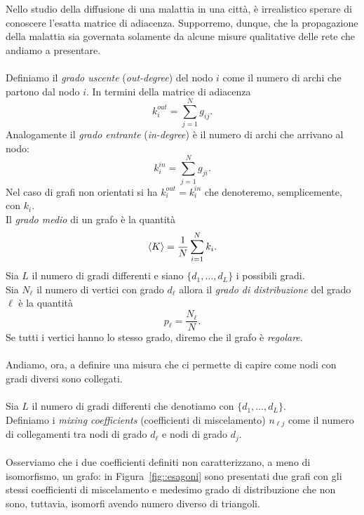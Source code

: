Nello studio della diffusione di una malattia in una citt\`a, \`e irrealistico sperare di conoscere l'esatta matrice di adiacenza. Supporremo, dunque, che la propagazione della malattia sia governata solamente da alcune misure qualitative delle rete che andiamo a presentare.\\ \\
Definiamo il \textit{grado uscente} (\textit{out-degree})  del nodo $i$  come il numero di archi che partono dal nodo $i$. In termini della matrice di adiacenza
$$ k_i^{out} =\sum_{j=1}^N g_{ij}.$$
Analogamente il \textit{grado entrante} (\textit{in-degree}) \`e il numero di archi che arrivano al nodo:
$$ k_i^{in} = \sum_{j=1}^N g_{ji}.$$
Nel caso di grafi non orientati si ha $k_i^{out} = k_i^{in}$ che denoteremo, semplicemente, con $k_i$.\\
Il \textit{grado medio} di un grafo \`e la quantit\`a 
$$ \langle K \rangle = \frac{1}{N}\sum_{i=1}^N k_i.$$
Sia $L$ il numero di gradi differenti e siano $\{ d_1, \dots, d_L\}$ i possibili gradi.\\
Sia $N_\ell$ il numero di vertici con grado $d_\ell$ allora il \textit{grado di distribuzione} del grado $\ell$ \`e la quantit\`a
$$ p_\ell = \frac{N_\ell}{N}.$$
Se tutti i vertici hanno lo stesso grado, diremo che il grafo \`e \textit{regolare}.\\  \\
Andiamo, ora, a definire una misura che ci permette di capire  come nodi con gradi diversi sono collegati.\\ \\ 
Sia $L$ il numero di gradi differenti che denotiamo con $\{ d_1, \dots, d_L\}$.\\
Definiamo i \textit{mixing coefficients} (coefficienti di miscelamento) $n_{\ell j}$ come il numero di collegamenti tra nodi di grado $d_\ell$ e nodi di grado $d_j$.\\ \\ 
Osserviamo che i due coefficienti definiti non caratterizzano, a meno di isomorfismo, un grafo: in  Figura~\ref{fig::esagoni}  sono presentati due grafi con gli stessi coefficienti di miscelamento e medesimo  grado di distribuzione  che non sono, tuttavia, isomorfi avendo numero diverso di triangoli.

